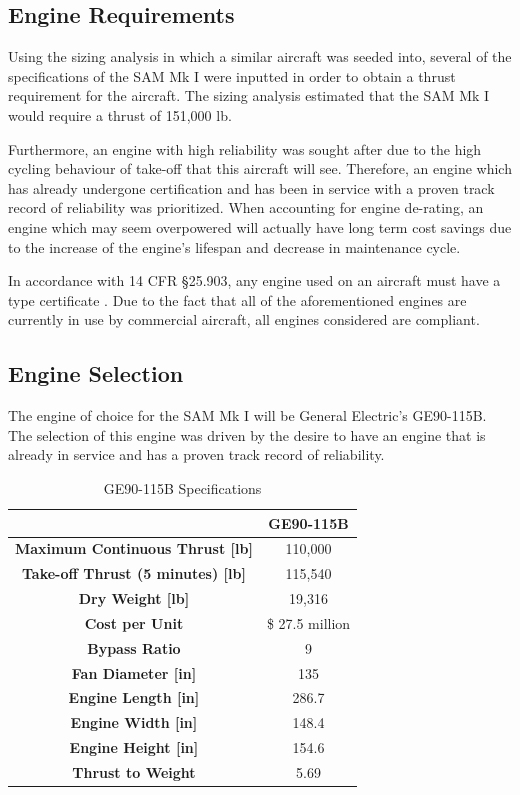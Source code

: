 \subsection{Engine Requirements}

Using the sizing analysis in which a similar aircraft was seeded into, several of the specifications of the SAM Mk I were inputted in order to obtain a thrust requirement for the aircraft. The sizing analysis estimated that the SAM Mk I would require a thrust of 151,000 lb.

Furthermore, an engine with high reliability was sought after due to the high cycling behaviour of take-off that this aircraft will see. Therefore, an engine which has already undergone certification and has been in service with a proven track record of reliability was prioritized. When accounting for engine de-rating, an engine which may seem overpowered will actually have long term cost savings due to the increase of the engine's lifespan and decrease in maintenance cycle.

In accordance with 14 CFR \S25.903, any engine used on an aircraft must have a type certificate \cite{cfr}. Due to the fact that all of the aforementioned engines are currently in use by commercial aircraft, all engines considered are compliant. 

\subsection{Engine Selection}

The engine of choice for the SAM Mk I will be General Electric's GE90-115B. The selection of this engine was driven by the desire to have an engine that is already in service and has a proven track record of reliability.

\begin{table}[!h]
    \centering
        \caption{GE90-115B Specifications}
    \begin{tabular}{|c||c|}\toprule
         & \textbf{GE90-115B} \\\hline \hline
         \textbf{Maximum Continuous Thrust [lb]} & 110,000  \cite{ge90} \\ \hline
         \textbf{Take-off Thrust (5 minutes) [lb]} & 115,540  \cite{ge90} \\ \hline
         \textbf{Dry Weight [lb]} & 19,316  \cite{ge90}  \\ \hline
         \textbf{Cost per Unit} &  \$ 27.5 million \cite{gecost}  \\ \hline
         \textbf{Bypass Ratio} & 9 \cite{safran}  \\ \hline
         \textbf{Fan Diameter [in]} & 135 \cite{ge} \\ \hline
         \textbf{Engine Length [in]} & 286.7 \cite{ge} \\ \hline
         \textbf{Engine Width [in]} & 148.4 \cite{ge} \\ \hline
         \textbf{Engine Height [in]} & 154.6 \cite{ge} \\ \hline
         \textbf{Thrust to Weight} & 5.69 \\ \bottomrule
    \end{tabular}
    \label{tab:GE90}
\end{table}

